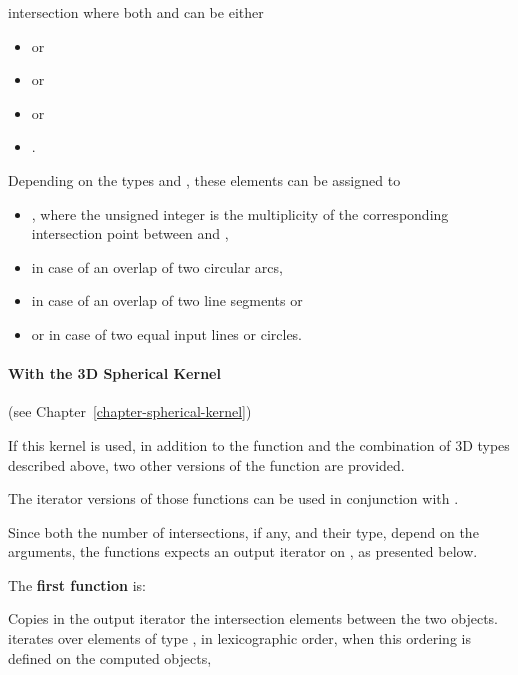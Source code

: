 \begin{ccRefFunction}{intersection}
where both  and  can be either
\begin{itemize}
\item {}  or
\item {}  or
\item {}  or
\item {} .
\end{itemize} 

Depending on the types  and , these
elements can be assigned to
\begin{itemize}
\item {} ,
where the unsigned integer is the multiplicity of the corresponding
intersection point between  and ,
\item {}  in case of an overlap of 
two circular arcs,
\item {}  in case of an overlap of two 
line segments or
\item {}  or 
 in case of two equal input lines or circles.
\end{itemize} 


\paragraph{With the 3D Spherical Kernel} (see Chapter~\ref{chapter-spherical-kernel}) 


If this kernel is used, in addition to the function and the
combination of 3D types described above, two other versions of the function
are provided.

The iterator versions of those functions can be used in conjunction
with .

Since both the number of intersections, if any, and their type, depend
on the arguments, the functions expects an output iterator on
,
as presented below.

The \textbf{first function} is:

{Copies in the output iterator the intersection elements between the
two objects.  iterates over
elements of type , in lexicographic order,
when this ordering is defined on the computed objects,}


\end{ccRefFunction}
